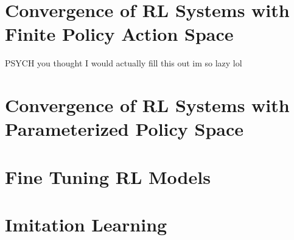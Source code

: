 \documentclass[]{report}
\begin{document}
  \chapter{Convergence of RL Systems with Finite Policy Action Space}
  PSYCH you thought I would actually fill this out im so lazy lol

  \chapter{Convergence of RL Systems with Parameterized Policy Space}

  \chapter{Fine Tuning RL Models}

  \chapter{Imitation Learning}
  
\end{document}

